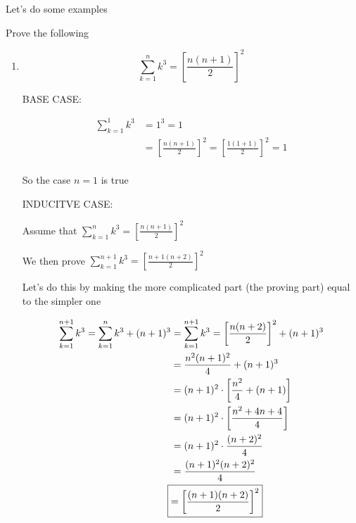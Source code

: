 \documentclass[../../Main.tex]{subfiles}
\begin{document}
Let's do some examples

\begin{example}
    Prove the following

    \begin{enumerate}
        \item
        {
            $$\sum_{k = 1}^{n}k^3 = \left[ \frac{n (n + 1)}{2}\right]^2$$

            \begin{poof}
                BASE CASE:

                \begin{align*}
                    \sum_{k = 1}^{1}k^3 &= 1^3 = 1 \\
                    &= \left[ \frac{n (n + 1)}{2}\right]^2 = \left[ \frac{1(1 + 1)}{2}\right]^2 = 1 \\
                \end{align*}

                So the case $n = 1$ is true

                INDUCITVE CASE:

                Assume that $\sum_{k = 1}^{n}k^3 = \left[ \frac{n (n + 1)}{2}\right]^2$

                We then prove $\sum_{k = 1}^{n + 1}k^3 = \left[ \frac{n + 1 (n + 2)}{2}\right]^2$

                Let's do this by making the more complicated part (the proving part) equal to the simpler one

                \begin{align*}
                    \sum_{k = 1}^{n + 1}k^3 = \sum_{k = 1}^{n}k^3 + (n + 1)^3 &= 
                    \sum_{k = 1}^{n + 1}k^3 = \left[ \frac{n(n + 2)}{2}\right]^2 + (n + 1)^3 \\
                    &= \frac{n^2(n + 1)^2}{4} + (n + 1)^3 \\
                    &= (n + 1)^2 \cdot \left[ \frac{n^2}{4} + (n + 1)\right] \\
                    &= (n + 1)^2 \cdot \left[ \frac{n^2 + 4n + 4}{4} \right] \\
                    &= (n + 1)^2 \cdot \frac{(n + 2)^2}{4} \\
                    &= \frac{(n + 1)^2(n + 2)^2}{4} \\
                    \Aboxed{&= \left[\frac{(n + 1)(n + 2)}{2}\right]^2}
                \end{align*}
            \end{poof}
        }


\end{enumerate}
\end{example}
\end{document}
